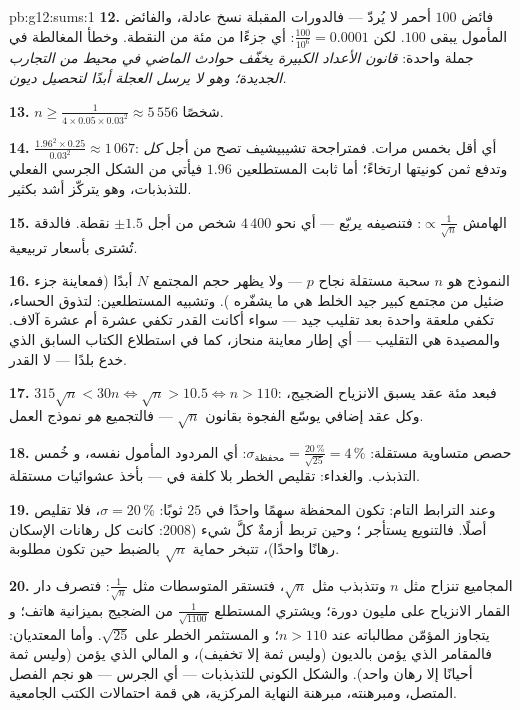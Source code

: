 \begin{solution}{pb:g12:sums:1}
\textbf{12.} فائض $100$ أحمر لا يُردّ ---
فالدورات المقبلة نسخ عادلة، والفائض المأمول يبقى $100$.
لكن $\frac{100}{10^6} = 0.0001$: أي جزءًا من مئة من النقطة.
وخطأ المغالطة في جملة واحدة: \emph{قانون الأعداد
الكبيرة يخفّف حوادث الماضي في محيط من التجارب الجديدة؛ وهو
لا يرسل العجلة أبدًا لتحصيل ديون.}

\textbf{13.} $n \geq \frac{1}{4 \times 0.05 \times 0.03^2}
\approx 5\,556$ شخصًا.

\textbf{14.} $\frac{1.96^2 \times 0.25}{0.03^2} \approx
1\,067$: أي أقل بخمس مرات. فمتراجحة تشيبيشيف تصح من أجل \emph{كل}
 وتدفع ثمن كونيتها ارتخاءً؛ أما ثابت
المستطلعين $1.96$ فيأتي من الشكل الجرسي الفعلي
للتذبذبات، وهو يتركّز أشد بكثير.

\textbf{15.} الهامش $\propto \frac{1}{\sqrt n}$: فتنصيفه
يربّع  --- أي نحو $4\,400$ شخص من أجل
$\pm 1.5$ نقطة. فالدقة تُشترى بأسعار تربيعية.

\textbf{16.} النموذج هو $n$ سحبة مستقلة  نجاح
$p$ --- ولا يظهر حجم المجتمع $N$ أبدًا
(فمعاينة جزء ضئيل من مجتمع كبير جيد الخلط
هي ما يشفّره ). وتشبيه المستطلعين: لتذوق
الحساء، تكفي ملعقة واحدة بعد تقليب جيد ---
سواء أكانت القدر تكفي عشرة أم عشرة آلاف. والمصيدة هي
التقليب --- أي إطار معاينة منحاز، كما في استطلاع الكتاب
السابق الذي خدع بلدًا --- لا القدر.

\textbf{17.} $315\sqrt n < 30n \iff \sqrt n > 10.5 \iff
n > 110$: فبعد مئة عقد يسبق الانزياح
الضجيج، وكل عقد إضافي يوسّع الفجوة بقانون
$\sqrt n$ --- فالتجميع \emph{هو} نموذج العمل.

\textbf{18.} حصص متساوية مستقلة: $\sigma_{\text{محفظة}} =
\frac{20\,\%}{\sqrt{25}} = 4\,\%$: أي المردود المأمول نفسه، و
خُمس التذبذب. والغداء: تقليص الخطر بلا كلفة
في  --- بأخذ  عشوائيات مستقلة.

\textbf{19.} وعند الترابط التام: تكون المحفظة سهمًا واحدًا
في $25$ ثوبًا: $\sigma = 20\,\%$، فلا تقليص أصلًا.
فالتنويع يستأجر \emph{}؛ وحين تربط أزمةٌ كلَّ شيء
(2008: كانت كل رهانات الإسكان رهانًا واحدًا)،
تتبخر حماية $\sqrt n$ بالضبط حين تكون
مطلوبة.

\textbf{20.} المجاميع تنزاح مثل $n$ وتتذبذب مثل
$\sqrt n$، فتستقر المتوسطات مثل $\frac{1}{\sqrt n}$: فتصرف
دار القمار الانزياح على مليون دورة؛ ويشتري المستطلع
$\frac{1}{\sqrt{1100}}$ من الضجيج بميزانية هاتف؛ و
يتجاوز المؤمّن مطالباته عند $n > 110$؛ و
 المستثمر الخطر على $\sqrt{25}$. وأما المعتديان: فالمقامر
الذي يؤمن بالديون (وليس ثمة إلا تخفيف)، و
المالي الذي يؤمن  (وليس ثمة أحيانًا
إلا رهان واحد). والشكل الكوني للتذبذبات ---
أي الجرس --- هو نجم الفصل المتصل، ومبرهنته،
مبرهنة النهاية المركزية، هي قمة احتمالات الكتب
الجامعية.
\end{solution}
